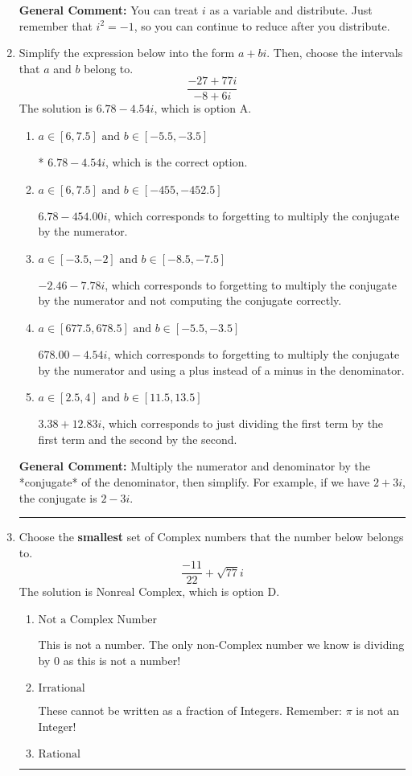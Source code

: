 \documentclass{extbook}[14pt]
\newcommand{\litem}[1]{\item #1

\rule{\textwidth}{0.4pt}}
\begin{document}
\begin{enumerate}
{\textbf{General Comment:} You can treat $i$ as a variable and distribute. Just remember that $i^2=-1$, so you can continue to reduce after you distribute.
}
\litem{
Simplify the expression below into the form $a+bi$. Then, choose the intervals that $a$ and $b$ belong to.
\[ \frac{-27 + 77 i}{-8 + 6 i} \]The solution is \( 6.78  - 4.54 i \), which is option A.\begin{enumerate}[label=\Alph*.]
\item \( a \in [6, 7.5] \text{ and } b \in [-5.5, -3.5] \)

* $6.78  - 4.54 i$, which is the correct option.
\item \( a \in [6, 7.5] \text{ and } b \in [-455, -452.5] \)

 $6.78  - 454.00 i$, which corresponds to forgetting to multiply the conjugate by the numerator.
\item \( a \in [-3.5, -2] \text{ and } b \in [-8.5, -7.5] \)

 $-2.46  - 7.78 i$, which corresponds to forgetting to multiply the conjugate by the numerator and not computing the conjugate correctly.
\item \( a \in [677.5, 678.5] \text{ and } b \in [-5.5, -3.5] \)

 $678.00  - 4.54 i$, which corresponds to forgetting to multiply the conjugate by the numerator and using a plus instead of a minus in the denominator.
\item \( a \in [2.5, 4] \text{ and } b \in [11.5, 13.5] \)

 $3.38  + 12.83 i$, which corresponds to just dividing the first term by the first term and the second by the second.
\end{enumerate}

\textbf{General Comment:} Multiply the numerator and denominator by the *conjugate* of the denominator, then simplify. For example, if we have $2+3i$, the conjugate is $2-3i$.
}
\litem{
Choose the \textbf{smallest} set of Complex numbers that the number below belongs to.
\[ \frac{-11}{22}+\sqrt{77} i \]The solution is \( \text{Nonreal Complex} \), which is option D.\begin{enumerate}[label=\Alph*.]
\item \( \text{Not a Complex Number} \)

This is not a number. The only non-Complex number we know is dividing by 0 as this is not a number!
\item \( \text{Irrational} \)

These cannot be written as a fraction of Integers. Remember: $\pi$ is not an Integer!
\item \( \text{Rational} \)


\end{enumerate}}
\end{enumerate}
\end{document}
